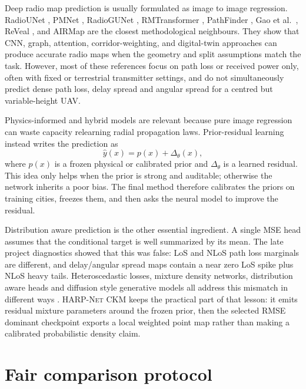 Deep radio map prediction is usually formulated as image to image regression.
RadioUNet \cite{radiounet2020}, PMNet \cite{pmnet2023}, RadioGUNet
\cite{radiogunet2025}, RMTransformer \cite{rmtransformer2025}, PathFinder
\cite{pathfinder2025}, Gao et al.\ \cite{gao2026}, ReVeal \cite{reveal2025},
and AIRMap \cite{airmap2025} are the closest methodological neighbours. They
show that CNN, graph, attention, corridor-weighting, and digital-twin
approaches can produce accurate radio maps when the geometry and split
assumptions match the task. However, most of these references focus on path
loss or received power only, often with fixed or terrestrial transmitter
settings, and do not simultaneously predict dense path loss, delay spread and
angular spread for a centred but variable-height UAV.

Physics-informed and hybrid models are relevant because pure image regression
can waste capacity relearning radial propagation laws. Prior-residual learning
instead writes the prediction as
\[
  \hat y(x) = p(x) + \Delta_\theta(x),
\]
where \(p(x)\) is a frozen physical or calibrated prior and
\(\Delta_\theta\) is a learned residual. This idea only helps when the prior is
strong and auditable; otherwise the network inherits a poor bias. The final
method therefore calibrates the priors on training cities, freezes them, and
then asks the neural model to improve the residual.

Distribution aware prediction is the other essential ingredient. A single MSE
head assumes that the conditional target is well summarized by its mean. The
late project diagnostics showed that this was false: LoS and NLoS path loss
marginals are different, and delay/angular spread maps contain a near zero LoS
spike plus NLoS heavy tails. Heteroscedastic losses, mixture density networks,
distribution aware heads and diffusion style generative models all address this mismatch in
different ways \cite{kendall2017uncertainties,saleh2021probabilistic,
garciamarti2020mixture,radiodiff2025}. \textsc{HARP-Net CKM} keeps the practical
part of that lesson: it emits residual mixture parameters around the frozen
prior, then the selected RMSE dominant checkpoint exports a local weighted point
map rather than making a calibrated probabilistic density claim.

\section{Fair comparison protocol}
\label{sec:soa_benchmarks}

